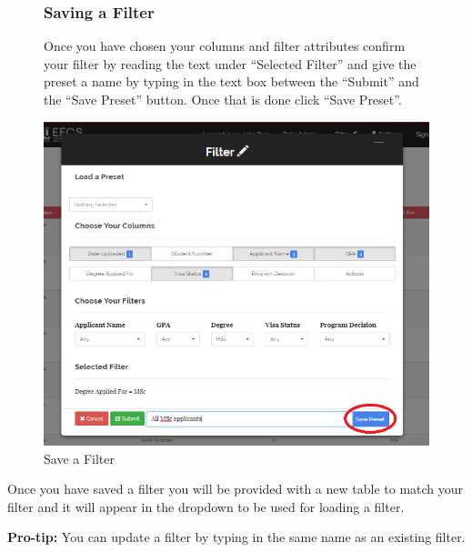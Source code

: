\documentclass[fontsize=12pt,paper=letter,twoside]{scrartcl}
\begin{document}
\clearpage

\begin{figure}[!htb]
\subsubsection{Saving a Filter}
Once you have chosen your columns and filter attributes confirm your filter by reading the text under ``Selected Filter'' and give the preset a name by typing in the text box between the ``Submit'' and the ``Save Preset'' button. Once that is done click ``Save Preset''.

\begin{center}
\includegraphics[width=.99\textwidth]{images/ma/saving_preset.png}
\end{center}
\caption{Save a Filter}
\label{fig:save_filter}
\end{figure}

\smallskip
\noindent Once you have saved a filter you will be provided with a new table to match your filter and it will appear in the dropdown to be used for loading a filter.

\smallskip
\noindent \textbf{Pro-tip:} You can update a filter by typing in the same name as an existing filter.
\end{document}
